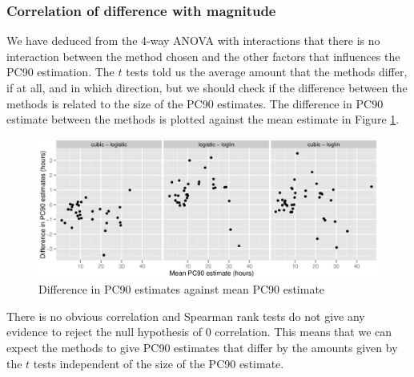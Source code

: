 \subsubsection*{Correlation of difference with magnitude}
We have deduced from the 4-way ANOVA with interactions that there is no interaction between the method chosen and the other factors that influences the PC90 estimation. The $t$ tests told us the average amount that the methods differ, if at all, and in which direction, but we should check if the difference between the methods is related to the size of the PC90 estimates. The difference in PC90 estimate between the methods is plotted against the mean estimate in Figure \ref{pc90est-cor}.
\begin{figure}[h]
\includegraphics[width=150mm]{pc90est-cor.eps} 
\caption{Difference in PC90 estimates against mean PC90 estimate}
\label{pc90est-cor}
\end{figure}

There is no obvious correlation and Spearman rank tests do not give any evidence to reject the null hypothesis of 0 correlation. This means that we can expect the methods to give PC90 estimates that differ by the amounts given by the $t$ tests independent of the size of the PC90 estimate.
